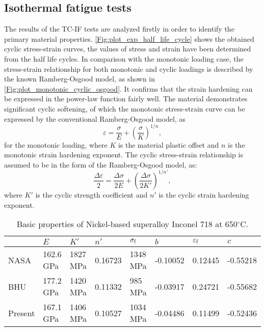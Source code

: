 \subsection{Isothermal fatigue tests}
\noindent
The results of the TC-IF tests are analyzed firstly in order to identify the primary material properties. \ref{Fig:plot_exp_half_life_cycle} shows the obtained cyclic stress-strain curves, the values of stress and strain have been determined from the half life cycles. In comparison with the monotonic loading case, the stress-strain relationship for both monotonic and cyclic loadings is described by the known Ramberg-Osgood model, as shown in \ref{Fig:plot_monotonic_cyclic_osgood}. It confirms that the strain hardening can be expressed in the power-law function fairly well. The material demonstrates significant cyclic softening, of which the monotonic stress-strain curve can be expressed by the conventional Ramberg-Osgood model, as
\begin{equation}
{\varepsilon } = \frac{{\sigma }}{{E}} + {\left( {\frac{{\sigma }}{{K}}} \right)^{1/n}},
\end{equation}
for the monotonic loading, where $K$ is the material plastic offset and $n$ is the monotonic strain hardening exponent.
The cyclic stress-strain relationship is assumed to be in the form of the Ramberg-Osgood model, as:
\begin{equation}
\frac{{\Delta \varepsilon }}{2} = \frac{{\Delta \sigma }}{{2E}} + {\left( {\frac{{\Delta \sigma }}{{2K'}}} \right)^{1/n'}},
\end{equation}
where $K'$ is the cyclic strength coefficient and $n'$ is the cyclic strain hardening exponent.

\begin{table}[htbp]
  \centering
  \caption{Basic properties of Nickel-based superalloy Inconel 718 at 650$^{\circ}$C.}
    \begin{tabular}{llllllll}
    \hline
          & $E$     & $K'$     & $n'$     & $\sigma_{\rm f}$    & $b$     & $\varepsilon_{\rm f}$    & $c$ \\
    \hline
    NASA \cite{kim1988elevated, nelson1992creep}  & 162.6 GPa & 1827 MPa  & 0.16723 & 1348 MPa & -0.10052 & 0.12445 & -0.55218 \\
    BHU \cite{Mahobia2014}   & 177.2 GPa & 1420 MPa  & 0.11332 & 985 MPa & -0.03917 & 0.24721 & -0.55682 \\
    Present   & 167.1 GPa & 1406 MPa  & 0.10527 & 1034 MPa & -0.04486 & 0.11499 & -0.52436 \\
    \hline
    \end{tabular}
  \label{tab:MechanicalProperties}
\end{table}

